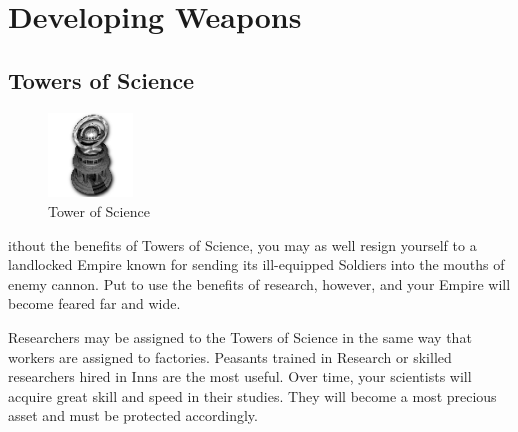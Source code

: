 
\chapter{Developing Weapons}

\section{Towers of Science}

\begin{figure}
	\vspace{-20pt}
	\begin{center}
		\includegraphics[width=0.2\textwidth]{Itower}
		\\ Tower of Science
	\end{center}
	\vspace{-20pt}
\end{figure}

ithout the benefits of Towers of Science, you may as well resign yourself to a landlocked Empire known for sending its ill-equipped Soldiers into the mouths of enemy cannon. Put to use the benefits of research, however, and your Empire will become feared far and wide.

Researchers may be assigned to the Towers of Science in the same way that workers are assigned to factories. Peasants trained in Research or skilled researchers hired in Inns are the most useful. Over time, your scientists will acquire great skill and speed in their studies. They will become a most precious asset and must be protected accordingly.

